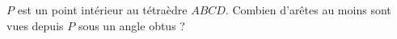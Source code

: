 $P$ est un point intérieur au tétraèdre $ABCD$. Combien d'arêtes au moins sont vues depuis $P$ sous un angle obtus ?
